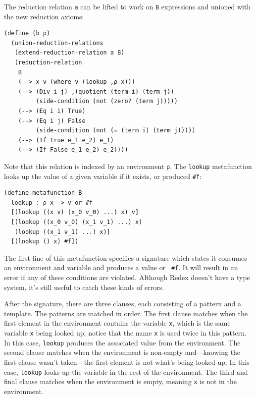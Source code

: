 The reduction relation {\tt a} can be lifted to work on {\tt B}
expressions and unioned with the new reduction axioms:
\begin{verbatim}
(define (b ρ)
  (union-reduction-relations 
   (extend-reduction-relation a B)
   (reduction-relation
    B
    (--> x v (where v (lookup ,ρ x)))
    (--> (Div i j) ,(quotient (term i) (term j))
         (side-condition (not (zero? (term j)))))    
    (--> (Eq i i) True)
    (--> (Eq i j) False
         (side-condition (not (= (term i) (term j)))))    
    (--> (If True e_1 e_2) e_1)
    (--> (If False e_1 e_2) e_2))))
\end{verbatim}
Note that this relation is indexed by an environment {\tt ρ}.
The {\tt lookup} metafunction looks up the value of a given
variable if it exists, or produced {\tt \#f}:
\begin{verbatim}
(define-metafunction B
  lookup : ρ x -> v or #f
  [(lookup ((x v) (x_0 v_0) ...) x) v]
  [(lookup ((x_0 v_0) (x_1 v_1) ...) x) 
   (lookup ((x_1 v_1) ...) x)]
  [(lookup () x) #f])
\end{verbatim}
The first line of this metafunction specifies a signature which states
it consumes an environment and variable and produces a value or {\tt
  \#f}.  It will result in an error if any of these conditions are
violated.  Although Redex doesn't have a type system, it's still
useful to catch these kinds of errors.

After the signature, there are three clauses, each consisting of a
pattern and a template.  The patterns are matched in order.  The first
clause matches when the first element in the environment contains the
variable {\tt x}, which is the same variable {\tt x} being looked up;
notice that the name {\tt x} is used twice in this pattern.  In this
case, {\tt lookup} produces the associated value from the environment.
The second clause matches when the environment is non-empty
and---knowing the first clause wasn't taken---the first element is not
what's being looked up.  In this case, {\tt lookup} looks up the
variable in the rest of the environment.  The third and final clause
matches when the environment is empty, meaning {\tt x} is not in the
environment.

